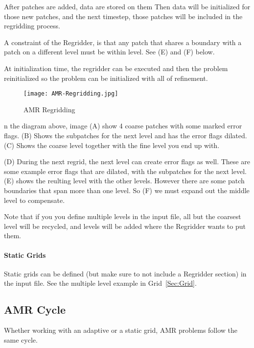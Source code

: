 After patches are added, data are stored on them Then data will be
initialized for those new patches, and the next timestep, those
patches will be included in the regridding process.

A constraint of the Regridder, is that any patch that shares a
boundary with a patch on a different level must be within level. See
(E) and (F) below.

At initialization time, the regridder can be executed and then the
problem reinitialized so the problem can be initialized with all
 of refinement.

\begin{figure}[htb]
  \centering
  \texttt{[image: AMR-Regridding.jpg]}
  \caption{AMR Regridding}
  \label{fig:amr1}
\end{figure}

n the diagram above, image (A) show 4 coarse patches with some marked
error flags. (B) Shows the subpatches for the next level and has the
error flags dilated. (C) Shows the coarse level together with the fine
level you end up with.

(D) During the next regrid, the next level can create error flags as
well. These are some example error flags that are dilated, with the
subpatches for the next level. (E) shows the reulting level with the
other levels. However there are some patch boundaries that span more
than one level. So (F) we must expand out the middle level to
compensate.

Note that if you you define multiple levels in the input file, all but
the coarsest level will be recycled, and levels will be added where
the Regridder wants to put them.

\paragraph{Static Grids}

Static grids can be defined (but make sure to not include a Regridder
section) in the input file. See the multiple level example in
Grid~\ref{Sec:Grid}.

\subsection{AMR Cycle}

Whether working with an adaptive or a static grid, AMR problems follow
the same cycle. 

